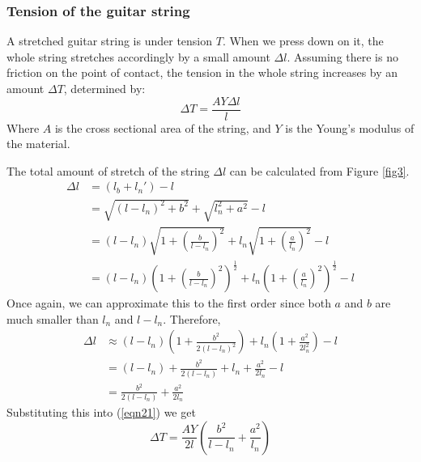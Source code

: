 \documentclass[11pt]{article}
\begin{document}
\begin{flushleft}
            \subsubsection*{Tension of the guitar string}
                A stretched guitar string is under tension $T$. When we press down on it, the whole string stretches accordingly by a small amount $\Delta l$. Assuming there is no friction on the point of contact, the tension in the whole string increases by an amount $\Delta T$, determined by:
                \begin{equation}
                    \Delta T = \frac{AY\Delta l}{l}\label{eqn21}
                \end{equation} 
                Where $A$ is the cross sectional area of the string, and $Y$ is the Young's modulus of the material. \cite{polak} \par
                The total amount of stretch of the string $\Delta l$ can be calculated from Figure \ref{fig3}. 
                \begin{align}
                    \Delta l &= (l_b + l_n') - l \\
                    &= \sqrt{(l-l_n)^2+b^2} + \sqrt{l_n^2+a^2} - l \\
                    &= (l-l_n)\sqrt{1+\left(\frac{b}{l-l_n}\right)^2} + l_n\sqrt{1+\left(\frac{a}{l_n}\right)^2} - l\\
                    &= (l-l_n)\left(1+\left(\frac{b}{l-l_n}\right)^2\right)^{\frac{1}{2}} + l_n\left(1+\left(\frac{a}{l_n}\right)^2\right)^{\frac{1}{2}} - l
                \end{align}
                Once again, we can approximate this to the first order since both $a$ and $b$ are much smaller than $l_n$ and $l-l_n$. Therefore,
                \begin{align}
                    \Delta l &\approx (l-l_n)\left(1+\frac{b^2}{2(l-l_n)^2}\right)+ l_n\left(1+\frac{a^2}{2l_n^2}\right) - l \label{eqn26} \\
                    &= (l - l_n) + \frac{b^2}{2(l-l_n)} + l_n + \frac{a^2}{2l_n} - l \\
                    &= \frac{b^2}{2(l-l_n)} + \frac{a^2}{2l_n}
                \end{align}
                Substituting this into (\ref{eqn21}) we get
                \begin{equation}
                    \Delta T = \frac{AY}{2l} \left( \frac{b^2}{l-l_n} + \frac{a^2}{l_n} \right) \label{eqn29}
                \end{equation}


\end{flushleft}
\end{document}
